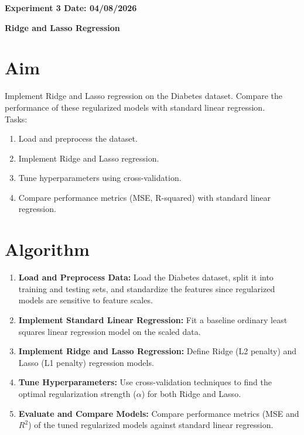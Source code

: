 \documentclass[12pt, a4paper]{report}
\begin{document}
\newpage 
\begin{center}
	\bfseries 
	Experiment 3 \hfill Date: 04/08/2026 
\end{center}


\begin{center}
	{\bfseries \Huge Ridge and Lasso Regression}	
\end{center}

\section*{Aim} 
Implement Ridge and Lasso regression on the Diabetes dataset. Compare the performance of these regularized
models with standard linear regression. \\
Tasks:
\begin{enumerate}[\quad -]
	\itemsep 0em 
	
	\item Load and preprocess the dataset.
	\item Implement Ridge and Lasso regression.
	\item Tune hyperparameters using cross-validation.
	\item Compare performance metrics (MSE, R-squared) with standard linear regression.
\end{enumerate}

\section*{Algorithm} 
\begin{enumerate}
	\itemsep 0em
	\item \textbf{Load and Preprocess Data:} Load the Diabetes dataset, split it into training and testing sets, and standardize the features since regularized models are sensitive to feature scales.
	\item \textbf{Implement Standard Linear Regression:} Fit a baseline ordinary least squares linear regression model on the scaled data.
	\item \textbf{Implement Ridge and Lasso Regression:} Define Ridge (L2 penalty) and Lasso (L1 penalty) regression models.
	\item \textbf{Tune Hyperparameters:} Use cross-validation techniques to find the optimal regularization strength ($\alpha$) for both Ridge and Lasso.
	\item \textbf{Evaluate and Compare Models:} Compare performance metrics (MSE and $R^2$) of the tuned regularized models against standard linear regression.
\end{enumerate}
\end{document}
